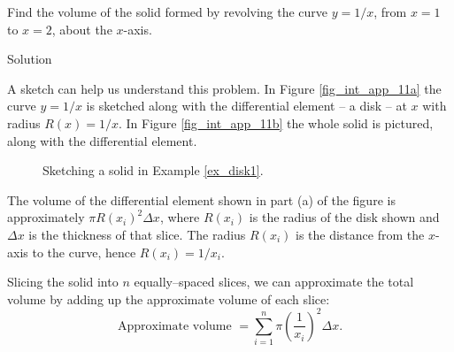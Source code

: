 \begin{example}\label{ex_disk1}
Find the volume of the solid formed by revolving the curve $y=1/x$, from $x=1$ to $x=2$, about the $x$-axis.

Solution 

A sketch can help us understand this problem. In Figure \ref{fig_int_app_11a} the curve $y=1/x$ is sketched along with the differential element -- a disk -- at $x$ with radius $R(x)=1/x$. In Figure \ref{fig_int_app_11b} the whole solid is pictured, along with the differential element. 

\begin{figure}[H]
\centering
\qquad
{}
\caption{Sketching a solid in Example \ref{ex_disk1}.}
\end{figure}

The volume of the differential element shown in part (a) of the figure is approximately $\pi R(x_i)^2\Delta x$, where $R(x_i)$ is the radius of the disk shown and $\Delta x$ is the thickness of that slice. The radius $R(x_i)$ is the distance from the $x$-axis to the curve, hence $R(x_i) = 1/x_i$.



Slicing the solid into $n$ equally--spaced slices, we can approximate the total volume by adding up the approximate volume of each slice:
$$\text{Approximate volume } = \sum_{i=1}^n \pi \left(\frac1{x_i}\right)^2\Delta x.$$


\end{example}

